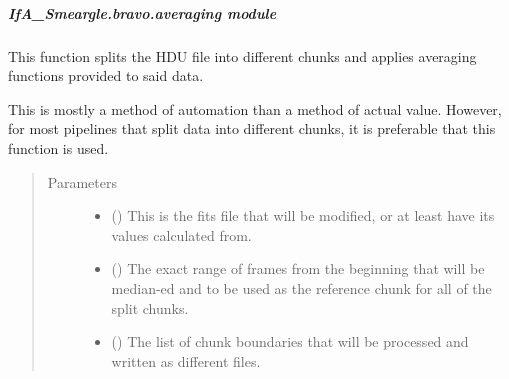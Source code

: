 \documentclass[letterpaper,10pt,english]{sphinxmanual}
\begin{document}
\subparagraph{IfA\_Smeargle.bravo.averaging module}
\label{\detokenize{python_docstrings/IfA_Smeargle.bravo.averaging:module-IfA_Smeargle.bravo.averaging}}\label{\detokenize{python_docstrings/IfA_Smeargle.bravo.averaging:ifa-smeargle-bravo-averaging-module}}\label{\detokenize{python_docstrings/IfA_Smeargle.bravo.averaging::doc}}

\begin{fulllineitems}
\label{\detokenize{python_docstrings/IfA_Smeargle.bravo.averaging:IfA_Smeargle.bravo.averaging.auto_avergae_slicing}}
This function splits the HDU file into different chunks and applies
averaging functions provided to said data.

This is mostly a method of automation than a method of actual value.
However, for most pipelines that split data into different chunks, it is
preferable that this function is used.
\begin{quote}\begin{description}
\item[{Parameters}] \leavevmode\begin{itemize}
\item {} 
 () \textendash{} This is the fits file that will be modified, or at least have its
values calculated from.

\item {} 
 () \textendash{} The exact range of frames from the beginning that will be median-ed
and to be used as the reference chunk for all of the split chunks.

\item {} 
 () \textendash{} The list of chunk boundaries that will be processed and written as
different files.


\end{itemize}
\end{description}
\end{quote}
\end{fulllineitems}
\end{document}
